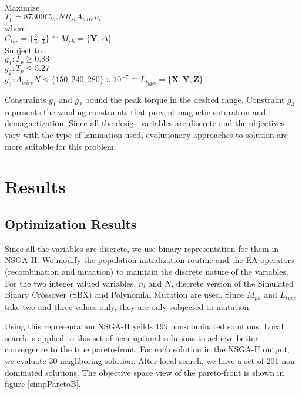 \begin{singlespacing}
\begin{flushleft}

Maximize \\
$ T_p = 87300 C_{tor} N R_{si} A_{wire} n_{l} $\\
where \\
$ C_{tor} = \{ \frac{2}{3}, \frac{1}{3} \} \cong M_{ph} = \{ \textbf{Y}, \Delta  \} $ 
\\[\baselineskip]


Subject to \\
$g_1: T_{p} \geqslant 0.83$ \\

$g_2: T_{p} \leqslant 5.27$ \\

$g_3: A_{wire}N \leqslant \{150, 240, 280\} \times 10^{-7} \cong L_{type} = \{ \textbf{X}, \textbf{Y}, \textbf{Z} \}$

\end{flushleft}

\end{singlespacing}

Constraints $g_1$ and $g_2$ bound the peak torque in the desired 
range. Constraint $g_3$ represents the winding constraints that 
prevent magnetic saturation and demagnetization. Since all the design 
variables are discrete and the objectives vary with the type of 
lamination used, evolutionary approaches to solution are more suitable
for this problem.

\section{Results}

\subsection{Optimization Results}

Since all the variables are discrete, we use binary representation
for them in NSGA-II. We modify the population initialization routine
and the EA operators (recombination and mutation) to maintain the 
discrete nature of the variables. For the two integer valued 
variables, $n_l$ and $N$, discrete version of the Simulated Binary 
Crossover (SBX) and Polynomial Mutation \cite{deb2001} are used. Since
$M_{ph}$ and $L_{type}$ take two and three values only, they are only
subjected to mutation.

Using this representation NSGA-II yeilds 199 non-dominated solutions.
Local search is applied to this set of near optimal solutions to 
achieve better convergence to the true pareto-front. For each 
solution in the NSGA-II output, we evaluate 30 neighboring solution.
After local search, we have a set of 201 non-dominated solutions.
The objective space view of the pareto-front is shown in figure 
\ref{simpParetoB}.
 
